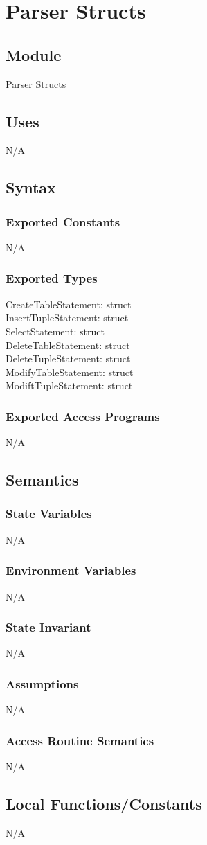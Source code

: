 \documentclass[12pt]{article}
\begin{document}
{\color{red}\section{Parser Structs}

\subsection{Module}
Parser Structs

\subsection{Uses}
N/A

\subsection{Syntax}
\subsubsection{Exported Constants}
N/A

\subsubsection{Exported Types}
CreateTableStatement: struct\\
InsertTupleStatement: struct\\
SelectStatement: struct\\
DeleteTableStatement: struct\\
DeleteTupleStatement: struct\\
ModifyTableStatement: struct\\
ModiftTupleStatement: struct

\subsubsection{Exported Access Programs}
N/A

\subsection{Semantics}
\subsubsection{State Variables}
N/A

\subsubsection{Environment Variables}
N/A

\subsubsection{State Invariant}
N/A

\subsubsection{Assumptions}
N/A

\subsubsection{Access Routine Semantics}
N/A

\subsection{Local Functions/Constants}
N/A}
\end{document}
